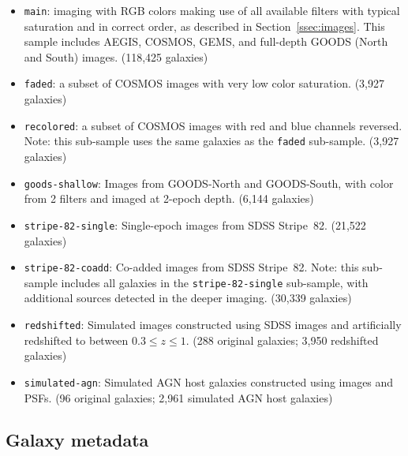\documentclass[twocolumn]{aastex6}
\begin{document}
\begin{itemize}

\item \texttt{main}: \hst{} imaging with RGB colors making use of all available
filters with typical saturation and in correct order, as described in
Section~\ref{ssec:images}. This sample includes AEGIS, COSMOS, GEMS, and
full-depth GOODS (North and South) images. (118,425 galaxies)

\item \texttt{faded}: a subset of COSMOS images with very low color saturation.
(3,927 galaxies)

\item \texttt{recolored}: a subset of COSMOS images with red and blue channels
reversed. Note: this sub-sample uses the same galaxies as the \texttt{faded}
sub-sample. (3,927 galaxies)

\item \texttt{goods-shallow}: Images from GOODS-North and GOODS-South, with
color from 2 filters and imaged at 2-epoch depth. (6,144 galaxies)

\item \texttt{stripe-82-single}: Single-epoch images from SDSS Stripe~82.
(21,522 galaxies)

\item \texttt{stripe-82-coadd}: Co-added images from SDSS Stripe~82. Note: this
sub-sample includes all galaxies in the \texttt{stripe-82-single} sub-sample,
with additional sources detected in the deeper imaging. (30,339 galaxies)

\item \texttt{redshifted}: Simulated \hst{} images constructed using SDSS
images and artificially redshifted to between $0.3 \leq z \leq 1$. (288
original galaxies; 3,950 redshifted galaxies)

\item \texttt{simulated-agn}: Simulated AGN host galaxies constructed using
\hst{} images and PSFs. (96 original galaxies; 2,961 simulated AGN host
galaxies)


\end{itemize}


\subsection{Galaxy metadata}
\end{document}
